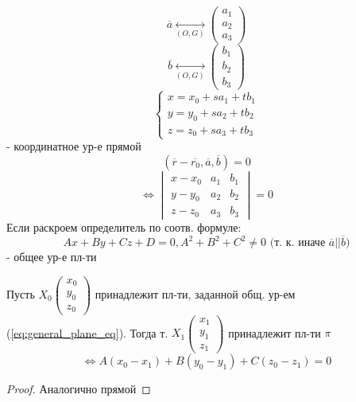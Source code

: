 \[
\overline{a} \underset{(O, G)}{\longleftrightarrow} \begin{pmatrix}a_1 \\ a_2 \\ a_3 \end{pmatrix}
\]
\[
\overline{b} \underset{(O, G)}{\longleftrightarrow} \begin{pmatrix}b_1 \\ b_2 \\ b_3\end{pmatrix}
\]
\begin{equation}
\begin{cases}
x = x_0 + sa_1 + tb_1 \\
y = y_0 + sa_2 + tb_2 \\
z = z_0 + sa_3 + tb_3
\end{cases}
\label{eq:coord-plane}
\end{equation}
- координатное ур-е прямой
\begin{equation}
  (\overline{r} - \overline{r_0}, \overline{a}, \overline{b}) = 0
  \label{eq:mixedprod-plane-eq}
\end{equation}
\begin{equation}
  \iff \begin{vmatrix}x - x_0 & a_1 & b_1 \\ y - y_0 & a_2 & b_2 \\ z - z_0 & a_3 & b_3\end{vmatrix} = 0
  \label{eq:det-plane-eq}
\end{equation}
Если раскроем определитель по соотв. формуле:
\begin{equation}
Ax + By + Cz + D = 0, A^{2} + B^{2} + C^{2} \neq 0 \text{ (т. к. иначе $\overline{a} || \overline{b}$)}
\label{eq:general_plane_eq}
\end{equation}
- общее ур-е пл-ти
\begin{statement}
Пусть $X_0 \begin{pmatrix}x_0 \\ y_0 \\ z_0 \end{pmatrix}$ принадлежит пл-ти, заданной общ. ур-ем (\ref{eq:general_plane_eq}). Тогда т. $X_1\begin{pmatrix}x_1 \\ y_1 \\ z_1 \end{pmatrix}$ принадлежит пл-ти $\pi$
\[
  \iff A(x_0 - x_1) + B(y_0 - y_1) + C(z_0 - z_1) = 0
\]
\end{statement}
\begin{proof}
Аналогично прямой
\end{proof}
